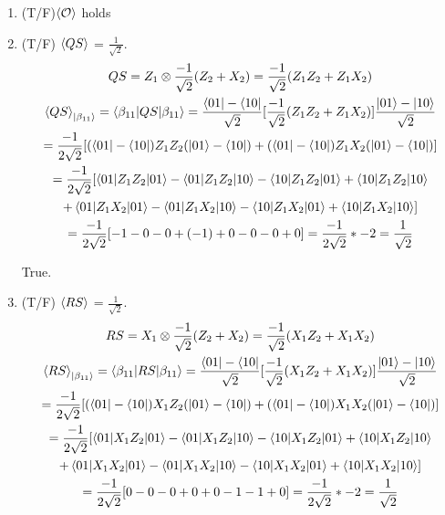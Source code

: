 \documentclass[]{article}
\begin{document}
\begin{enumerate}
      \begin{enumerate}
        \item (T/F)$\braket{\mathcal O}$ holds
        \item (T/F) $\braket{QS}$ = $\frac{1}{\sqrt{2}}$.
          \begin{gather*}
            QS = Z_1 \otimes \frac{-1}{\sqrt{2}}(Z_2 + X_2) = \frac{-1}{\sqrt{2}}(Z_1 Z_2 + Z_1 X_2)\\
            \braket{QS}_{\ket{\beta_{11}}} = \braket{\beta_{11} | QS | \beta_{11}}
            = \frac{\bra{01} - \bra{10}}{\sqrt{2}}[\frac{-1}{\sqrt{2}}(Z_1 Z_2 + Z_1 X_2)]
            \frac{\ket{01} - \ket{10}}{\sqrt{2}}\\
            = \frac{-1}{2\sqrt{2}}[(\bra{01} - \bra{10})Z_1 Z_2(\ket{01} - \bra{10}) + 
            (\bra{01} - \bra{10})Z_1 X_2(\ket{01} - \bra{10})]\\
            = \frac{-1}{2\sqrt{2}}[
            \braket{01|Z_1 Z_2|01} - \braket{01|Z_1 Z_2|10} - \braket{10|Z_1 Z_2|01} + \braket{10|Z_1 Z_2|10}\\
            + \braket{01|Z_1 X_2|01} - \braket{01|Z_1 X_2|10} - \braket{10|Z_1 X_2|01} + \braket{10|Z_1 X_2|10}]\\
            = \frac{-1}{2\sqrt{2}}[-1 -0 -0 + (-1) + 0-0-0+0] = \frac{-1}{2\sqrt{2}}*-2 = \frac{1}{\sqrt{2}}
          \end{gather*}
          
          True.
        \item (T/F) $\braket{RS}$ = $\frac{1}{\sqrt{2}}$.
          \begin{gather*}
            RS = X_1 \otimes \frac{-1}{\sqrt{2}}(Z_2 + X_2) = \frac{-1}{\sqrt{2}}(X_1 Z_2 + X_1 X_2)\\
            \braket{RS}_{\ket{\beta_{11}}} = \braket{\beta_{11} | RS | \beta_{11}}
            = \frac{\bra{01} - \bra{10}}{\sqrt{2}}[\frac{-1}{\sqrt{2}}(X_1 Z_2 + X_1 X_2)]
            \frac{\ket{01} - \ket{10}}{\sqrt{2}}\\
            = \frac{-1}{2\sqrt{2}}[(\bra{01} - \bra{10})X_1 Z_2(\ket{01} - \bra{10}) + 
            (\bra{01} - \bra{10})X_1 X_2(\ket{01} - \bra{10})]\\
            = \frac{-1}{2\sqrt{2}}[
            \braket{01|X_1 Z_2|01} - \braket{01|X_1 Z_2|10} - \braket{10|X_1 Z_2|01} + \braket{10|X_1 Z_2|10}\\
            + \braket{01|X_1 X_2|01} - \braket{01|X_1 X_2|10} - \braket{10|X_1 X_2|01} + \braket{10|X_1 X_2|10}]\\
            = \frac{-1}{2\sqrt{2}}[0-0-0+0 + 0 - 1 -1 +0] = \frac{-1}{2\sqrt{2}}*-2 = \frac{1}{\sqrt{2}}
          \end{gather*}


\end{enumerate}
\end{enumerate}
\end{document}
